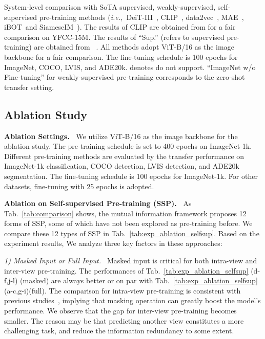 \documentclass[10pt,twocolumn,letterpaper]{article}
\def\ie{\textit{i.e.,~}}
\begin{document}
\begin{table*}
    \caption{System-level comparison with SoTA supervised, weakly-supervised, self-supervised pre-training methods (\ie DeiT-III~\cite{Touvron2022DeiTIR}, CLIP~\cite{radford2021learning}, data2vec~\cite{baevski2022data2vec}, MAE~\cite{he2022masked}, iBOT~\cite{zhou2021ibot}and SiameseIM~\cite{anonymous2022siamese}). The results of CLIP are obtained from \cite{mu2022slip} for a fair comparison on YFCC-15M. The results of ``Sup.'' (refers to supervised pre-training) are obtained from ~\cite{li2022exploring}. All methods adopt ViT-B/16 as the image backbone for a fair comparison. The fine-tuning schedule is 100 epochs for ImageNet, COCO, LVIS, and ADE20k.  denotes do not support.  ``ImageNet w/o Fine-tuning'' for weakly-supervised pre-training corresponds to the zero-shot transfer setting.}
    \vspace{-1.0em}
    \label{tab:exp_main}
\end{table*} 
\subsection{Ablation Study}
\label{sec:exp_ablation}


\vspace{0.5em}\noindent\textbf{Ablation Settings.~} We utilize ViT-B/16 as the image backbone for the ablation study. The pre-training schedule is set to 400 epochs on ImageNet-1k. Different pre-training methods are evaluated by the transfer performance on ImageNet-1k classification, COCO detection, LVIS detection, and ADE20k segmentation. The fine-tuning schedule is 100 epochs for ImageNet-1k. For other datasets, fine-tuning with 25 epochs is adopted.

\vspace{0.5em}\noindent\textbf{Ablation on Self-supervised Pre-training (SSP).~} As Tab.~\ref{tab:comparison} shows, the mutual information framework proposes 12 forms of SSP, some of which have not been explored as pre-training before. We compare these 12 types of SSP in Tab.~\ref{tab:exp_ablation_selfsup}. Based on the experiment results, We analyze three key factors in these approaches: 


\noindent\emph{1) Masked Input or Full Input.~} Masked input is critical for both intra-view and inter-view pre-training. The performances of Tab.~\ref{tab:exp_ablation_selfsup} (d-f,j-l) (masked) are always better or on par with Tab.~\ref{tab:exp_ablation_selfsup} (a-c,g-i)(full). The comparison for intra-view pre-training is consistent with previous studies~\cite{he2022masked}, implying that masking operation can greatly boost the model's performance. We observe that the gap for inter-view pre-training becomes smaller. The reason may be that predicting another view constitutes a more challenging task, and reduce the information redundancy to some extent.
\end{document}
